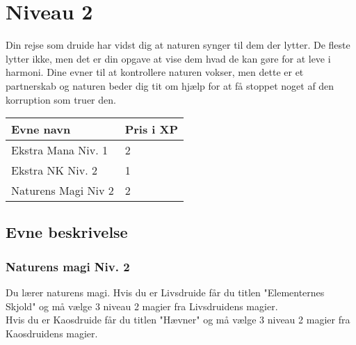 \chapter*{Niveau 2}

Din rejse som druide har vidst dig at naturen synger til dem der lytter. De fleste lytter ikke, men det er din opgave at vise dem hvad de kan gøre for at leve i harmoni. Dine evner til at kontrollere naturen vokser, men dette er et partnerskab og naturen beder dig tit om hjælp for at få stoppet noget af den korruption som truer den.

\begin{table}[H]
    \centering
    \begin{tabular}{|p{}|p{}|}
    \rowcolor{cerulean!80}\hline
        Evne navn & Pris i XP \\\hline
        Ekstra Mana Niv. 1 & 2\\\hline
        Ekstra NK Niv. 2 & 1\\\hline
        Naturens Magi Niv 2 & 2\\\hline
    \end{tabular}
\end{table}
\section*{Evne beskrivelse}





\subsection*{Naturens magi Niv. 2}
Du lærer naturens magi. Hvis du er Livsdruide får du titlen "Elementernes Skjold" og må vælge 3 niveau 2 magier fra Livsdruidens magier.\\ Hvis du er Kaosdruide får du titlen "Hævner" og må vælge 3 niveau 2 magier fra Kaosdruidens magier.\\